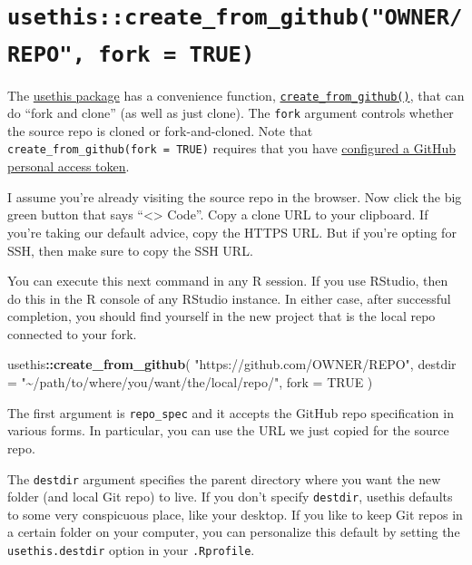 \documentclass[
]{book}
\newenvironment{Shaded}{\begin{snugshade}}{\end{snugshade}}
\newcommand{\AttributeTok}[1]{\textcolor[rgb]{0.13,0.29,0.53}{#1}}
\newcommand{\ConstantTok}[1]{\textcolor[rgb]{0.56,0.35,0.01}{#1}}
\newcommand{\FunctionTok}[1]{\textcolor[rgb]{0.13,0.29,0.53}{\textbf{#1}}}
\newcommand{\NormalTok}[1]{#1}
\newcommand{\SpecialCharTok}[1]{\textcolor[rgb]{0.81,0.36,0.00}{\textbf{#1}}}
\newcommand{\StringTok}[1]{\textcolor[rgb]{0.31,0.60,0.02}{#1}}
\begin{document}
\section{\texorpdfstring{\texttt{usethis::create\_from\_github("OWNER/REPO",\ fork\ =\ TRUE)}}{usethis::create\_from\_github("OWNER/REPO", fork = TRUE)}}\label{fork-and-clone-create-from-github}

The \href{https://usethis.r-lib.org}{usethis package} has a convenience function, \href{https://usethis.r-lib.org/reference/create_from_github.html}{\texttt{create\_from\_github()}}, that can do ``fork and clone'' (as well as just clone).
The \texttt{fork} argument controls whether the source repo is cloned or fork-and-cloned.
Note that \texttt{create\_from\_github(fork\ =\ TRUE)} requires that you have \hyperref[https-pat]{configured a GitHub personal access token}.

I assume you're already visiting the source repo in the browser.
Now click the big green button that says ``\textless\textgreater{} Code''.
Copy a clone URL to your clipboard.
If you're taking our default advice, copy the HTTPS URL.
But if you're opting for SSH, then make sure to copy the SSH URL.

You can execute this next command in any R session.
If you use RStudio, then do this in the R console of any RStudio instance.
In either case, after successful completion, you should find yourself in the new project that is the local repo connected to your fork.

\begin{Shaded}
\begin{Highlighting}[]
\NormalTok{usethis}\SpecialCharTok{::}\FunctionTok{create\_from\_github}\NormalTok{(}
  \StringTok{"https://github.com/OWNER/REPO"}\NormalTok{,}
  \AttributeTok{destdir =} \StringTok{"\textasciitilde{}/path/to/where/you/want/the/local/repo/"}\NormalTok{,}
  \AttributeTok{fork =} \ConstantTok{TRUE}
\NormalTok{)}
\end{Highlighting}
\end{Shaded}

The first argument is \texttt{repo\_spec} and it accepts the GitHub repo specification in various forms.
In particular, you can use the URL we just copied for the source repo.

The \texttt{destdir} argument specifies the parent directory where you want the new folder (and local Git repo) to live.
If you don't specify \texttt{destdir}, usethis defaults to some very conspicuous place, like your desktop.
If you like to keep Git repos in a certain folder on your computer, you can personalize this default by setting the \texttt{usethis.destdir} option in your \texttt{.Rprofile}.
\end{document}
